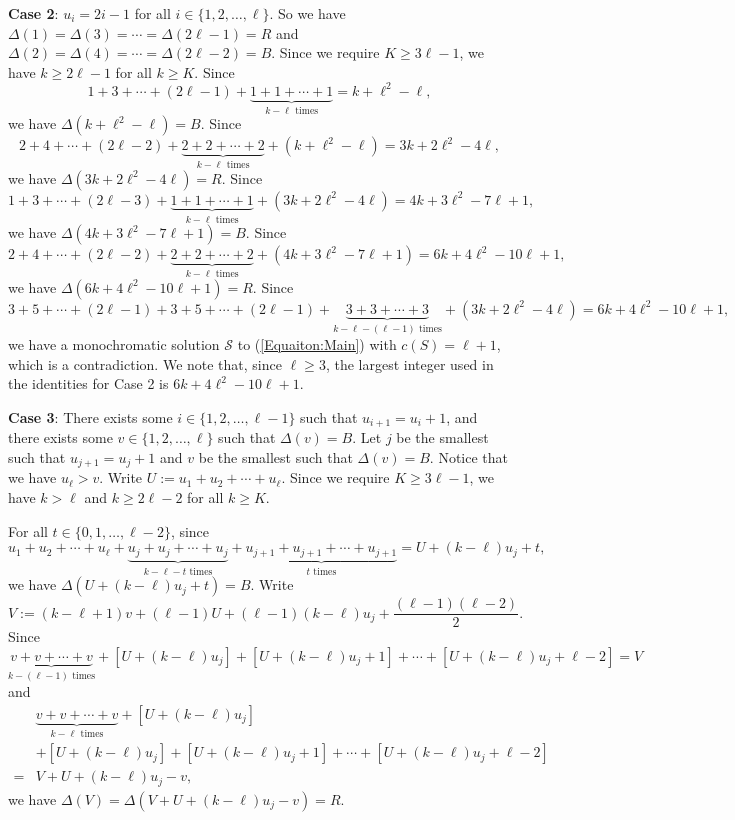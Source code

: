 \documentclass[11pt]{article}
\theoremstyle{definition}
\begin{document}
\textbf{Case 2}: $u_i=2i-1$ for all $i\in\{1,2,\ldots,\ell\}$. So we have $\Delta(1)=\Delta(3)=\cdots=\Delta(2\ell-1)=R$ and $\Delta(2)=\Delta(4)=\cdots=\Delta(2\ell-2)=B$. Since we require $K\geq3\ell-1$, we have $k\geq2\ell-1$ for all $k\geq K$. Since
\[
1+3+\cdots+(2\ell-1)+\underbrace{1+1+\cdots+1}_{k-\ell\text{ times}}=k+\ell^2-\ell,
\]
we have $\Delta(k+\ell^2-\ell)=B$. Since
\[
2+4+\cdots+(2\ell-2)+\underbrace{2+2+\cdots+2}_{k-\ell\text{ times}}+(k+\ell^2-\ell)=3k+2\ell^2-4\ell,
\]
we have $\Delta(3k+2\ell^2-4\ell)=R$. Since
\[
1+3+\cdots+(2\ell-3)+\underbrace{1+1+\cdots+1}_{k-\ell\text{ times}}+(3k+2\ell^2-4\ell)=4k+3\ell^2-7\ell+1,
\]
we have $\Delta(4k+3\ell^2-7\ell+1)=B$. Since
\[
2+4+\cdots+(2\ell-2)+\underbrace{2+2+\cdots+2}_{k-\ell\text{ times}}+(4k+3\ell^2-7\ell+1)=6k+4\ell^2-10\ell+1,
\]
we have $\Delta(6k+4\ell^2-10\ell+1)=R$. Since
\[
3+5+\cdots+(2\ell-1)+3+5+\cdots+(2\ell-1)+\underbrace{3+3+\cdots+3}_{k-\ell-(\ell-1)\text{ times}}+(3k+2\ell^2-4\ell)=6k+4\ell^2-10\ell+1,
\]
we have a monochromatic solution $\mathcal{S}$ to (\ref{Equaiton:Main}) with $c(S)=\ell+1$, which is a contradiction. We note that, since $\ell\geq3$, the largest integer used in the identities for Case 2 is $6k+4\ell^2-10\ell+1$. 

\textbf{Case 3}: There exists some $i\in\{1,2,\ldots,\ell-1\}$ such that $u_{i+1}=u_{i}+1$, and there exists some $v\in\{1,2,\ldots,\ell\}$ such that $\Delta(v)=B$. Let $j$ be the smallest such that $u_{j+1}=u_{j}+1$ and $v$ be the smallest such that $\Delta(v)=B$. Notice that we have $u_{\ell}>v$. Write $U:=u_1+u_2+\cdots+u_\ell$. Since we require $K\geq3\ell-1$, we have $k>\ell$ and $k\geq2\ell-2$ for all $k\geq K$.

For all $t\in\{0,1,\ldots,\ell-2\}$, since
\[
u_1+u_2+\cdots+u_{\ell}+\underbrace{u_j+u_j+\cdots+u_j}_{k-\ell-t\text{ times}}+\underbrace{u_{j+1}+u_{j+1}+\cdots+u_{j+1}}_{t\text{ times}}=U+(k-\ell)u_j+t,
\]
we have $\Delta(U+(k-\ell)u_j+t)=B$. Write
\[
V:=(k-\ell+1)v+(\ell-1)U+(\ell-1)(k-\ell)u_j+\frac{(\ell-1)(\ell-2)}{2}.
\]
Since
\[
\underbrace{v+v+\cdots+v}_{k-(\ell-1)\text{ times}}+[U+(k-\ell)u_j]+[U+(k-\ell)u_j+1]+\cdots+[U+(k-\ell)u_j
+\ell-2]=V
\]
and
\[
\begin{split}
&\underbrace{v+v+\cdots+v}_{k-\ell\text{ times}}+[U+(k-\ell)u_j]\\&+[U+(k-\ell)u_j]+[U+(k-\ell)u_j+1]+\cdots+[U+(k-\ell)u_j+\ell-2]\\=&V+U+(k-\ell)u_j-v,
\end{split}
\]
we have $\Delta(V)=\Delta(V+U+(k-\ell)u_j-v)=R$.
\end{document}
